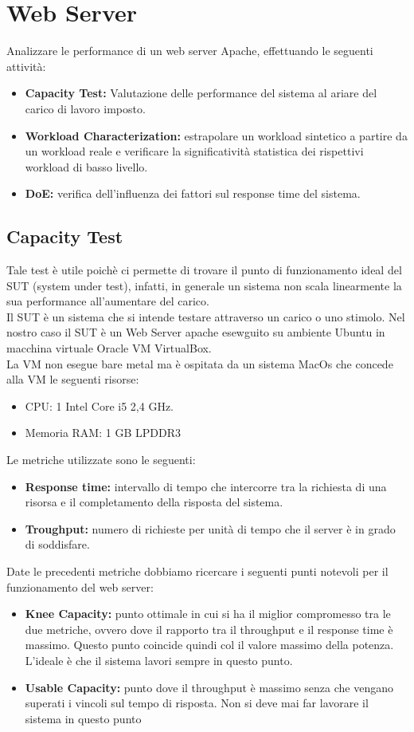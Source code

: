 \chapter{Web Server}
Analizzare le performance di un web server Apache, effettuando le seguenti attività:

\begin{itemize}
    \item \textbf{Capacity Test:} Valutazione delle performance del sistema al ariare del carico di lavoro imposto.
    \item \textbf{Workload Characterization: } estrapolare un workload sintetico a partire da un workload reale e verificare la significatività statistica dei rispettivi workload di basso livello.
    \item \textbf{DoE: } verifica dell'influenza dei fattori sul response time del sistema. 
\end{itemize}
\section{Capacity Test}
Tale test è utile poichè ci permette di trovare il punto di funzionamento ideal del SUT (system under test), infatti, in generale un sistema non scala linearmente la sua performance all'aumentare del carico.\\
Il SUT è un sistema che si intende testare attraverso un carico o uno stimolo.
Nel nostro caso il SUT è un Web Server apache esewguito su ambiente Ubuntu in macchina virtuale Oracle VM VirtualBox.\\
La VM non esegue bare metal ma è ospitata da un sistema MacOs che concede alla VM le seguenti risorse:
\begin{itemize}
    \item CPU: 1 Intel Core i5 2,4 GHz.
    \item Memoria RAM: 1 GB LPDDR3 
\end{itemize}
Le metriche utilizzate sono le seguenti: 
\begin{itemize}
    \item \textbf{Response time: }intervallo di tempo che intercorre tra la richiesta di una risorsa e il completamento della risposta del sistema.
    \item \textbf{Troughput: }numero di richieste per unità di tempo che il server è in grado di soddisfare.
\end{itemize}
Date le precedenti metriche dobbiamo ricercare i seguenti punti notevoli per il funzionamento del web server:
\begin{itemize}
    \item \textbf{Knee Capacity: }punto ottimale in cui si ha il miglior compromesso tra le due metriche, ovvero dove il rapporto tra il throughput e il response time è massimo. Questo punto coincide quindi col il valore massimo della potenza. L'ideale è che il sistema lavori sempre in questo punto.
    \item \textbf{Usable Capacity: }punto dove il throughput è massimo senza che vengano superati i vincoli sul tempo di risposta. Non si deve mai far lavorare il sistema in questo punto
\end{itemize}

